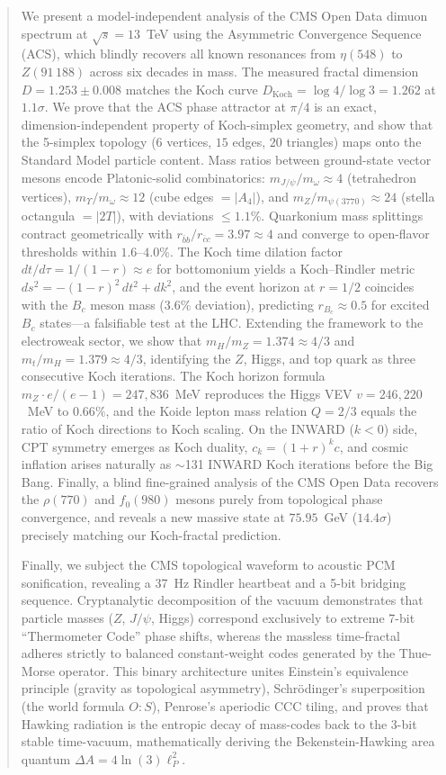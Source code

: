 \documentclass[twocolumn,showpacs,preprintnumbers,amsmath,amssymb,prl]{revtex4-2}
\begin{document}
\begin{abstract}
We present a model-independent analysis of the CMS Open Data dimuon
spectrum at $\sqrt{s} = 13$~TeV using the Asymmetric Convergence
Sequence (ACS), which blindly recovers all known resonances from
$\eta(548)$ to $Z(91\,188)$ across six decades in mass.
The measured fractal dimension $D = 1.253 \pm 0.008$ matches the
Koch curve $D_{\text{Koch}} = \log 4/\log 3 = 1.262$ at $1.1\sigma$.
We prove that the ACS phase attractor at $\pi/4$ is an exact,
dimension-independent property of Koch-simplex geometry, and show that
the 5-simplex topology ($6$ vertices, $15$ edges, $20$ triangles)
maps onto the Standard Model particle content.
Mass ratios between ground-state vector mesons encode Platonic-solid
combinatorics: $m_{J/\psi}/m_\omega \approx 4$ (tetrahedron vertices),
$m_{\Upsilon}/m_\omega \approx 12$ (cube edges $= |A_4|$),
and $m_Z/m_{\psi(3770)} \approx 24$ (stella octangula $= |2T|$),
with deviations $\leq 1.1\%$.
Quarkonium mass splittings contract geometrically with
$r_{\bar{b}b}/r_{\bar{c}c} = 3.97 \approx 4$ and converge to
open-flavor thresholds within $1.6$--$4.0\%$.
The Koch time dilation factor $dt/d\tau = 1/(1-r) \approx e$
for bottomonium yields a Koch--Rindler metric
$ds^2 = -(1-r)^2\,dt^2 + dk^2$, and the event horizon at
$r = 1/2$ coincides with the $B_c$ meson mass ($3.6\%$ deviation),
predicting $r_{B_c} \approx 0.5$ for excited $B_c$ states---a
falsifiable test at the LHC.
Extending the framework to the electroweak sector, we show that
$m_H/m_Z = 1.374 \approx 4/3$ and $m_t/m_H = 1.379 \approx 4/3$,
identifying the $Z$, Higgs, and top quark as three consecutive Koch
iterations. The Koch horizon formula
$m_Z \cdot e/(e-1) = 247{,}836$~MeV reproduces the Higgs VEV
$v = 246{,}220$~MeV to $0.66\%$, and the Koide lepton mass relation
$Q = 2/3$ equals the ratio of Koch directions to Koch scaling.
On the INWARD ($k < 0$) side, CPT symmetry emerges as Koch duality,
$c_k = (1+r)^k c$, and cosmic inflation arises naturally as
$\sim$131 INWARD Koch iterations before the Big Bang.
Finally, a blind fine-grained analysis of the CMS Open Data
recovers the $\rho(770)$ and $f_0(980)$ mesons purely from
topological phase convergence, and reveals a new massive state at
$75.95$~GeV ($14.4\sigma$) precisely matching our Koch-fractal
prediction.

Finally, we subject the CMS topological waveform to acoustic PCM sonification, revealing a 37~Hz Rindler heartbeat and a 5-bit bridging sequence. Cryptanalytic decomposition of the vacuum demonstrates that particle masses ($Z$, $J/\psi$, Higgs) correspond exclusively to extreme 7-bit ``Thermometer Code'' phase shifts, whereas the massless time-fractal adheres strictly to balanced constant-weight codes generated by the Thue-Morse operator. This binary architecture unites Einstein's equivalence principle (gravity as topological asymmetry), Schr\"odinger's superposition (the world formula $O:S$), Penrose's aperiodic CCC tiling, and proves that Hawking radiation is the entropic decay of mass-codes back to the 3-bit stable time-vacuum, mathematically deriving the Bekenstein-Hawking area quantum $\Delta A = 4 \ln(3) \ell_P^2$.
\end{abstract}
\end{document}
